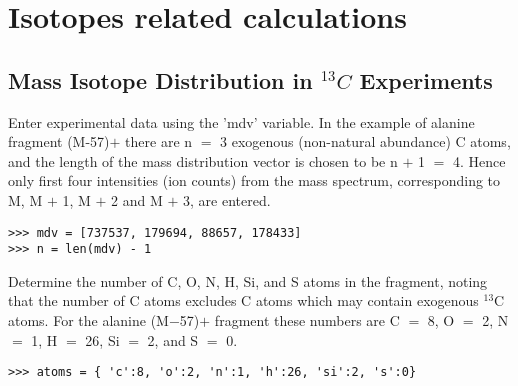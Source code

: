 

\chapter{Isotopes related calculations}

\section
{Mass Isotope Distribution in $^{13}C$ Experiments}


Enter experimental data using the 'mdv' variable. In the example of
alanine fragment (M-57)$+$ there are n $=$ 3 exogenous (non-natural
abundance) C atoms, and the length of the mass distribution vector
is chosen to be n $+$ 1 $=$ 4. Hence only first four intensities
(ion counts) from the mass spectrum, corresponding to M, M $+$ 1,
M $+$ 2 and M $+$ 3, are entered.

\begin{verbatim}
>>> mdv = [737537, 179694, 88657, 178433] 
>>> n = len(mdv) - 1
\end{verbatim}

Determine the number of C, O, N, H, Si, and S atoms in the fragment,
noting that the number of C atoms excludes C atoms which may contain
exogenous $^{\text{13}}$C atoms. For the alanine (M$-$57)$+$ fragment
these numbers are C $=$ 8, O $=$ 2, N $=$ 1, H $=$ 26, Si $=$
2, and S $=$ 0.

\begin{verbatim} 
>>> atoms = { 'c':8, 'o':2, 'n':1, 'h':26, 'si':2, 's':0}
\end{verbatim}

